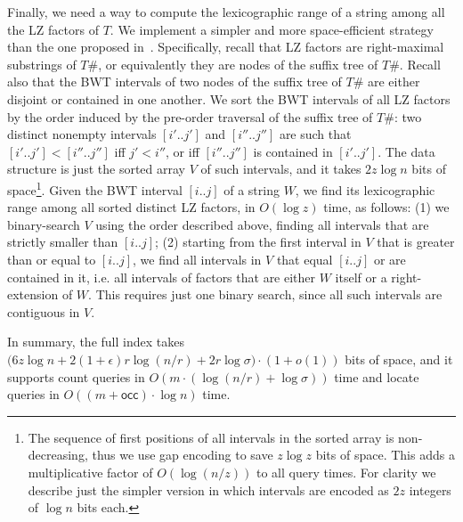 \documentclass[a4paper,UKenglish]{lipics-v2016}
\newcommand{\occ}
  {\ensuremath{\mathsf{occ}}}
\newcommand{\runs}{r}
\begin{document}
Finally, we need a way to compute the lexicographic range of a string among all the LZ factors of $T$. We implement a simpler and more space-efficient strategy than the one proposed in~\cite{belazzougui2015composite}. Specifically, recall that LZ factors are right-maximal substrings of $T\#$, or equivalently they are nodes of the suffix tree of $T\#$. Recall also that the BWT intervals of two nodes of the suffix tree of $T\#$ are either disjoint or contained in one another. We sort the BWT intervals of all LZ factors by the order induced by the pre-order traversal of the suffix tree of $T\#$: two distinct nonempty intervals $[i'..j']$ and $[i''..j'']$ are such that $[i'..j']<[i''..j'']$ iff $j'<i''$, or iff $[i''..j'']$ is contained in $[i'..j']$. The data structure is just the sorted array $V$ of such intervals, and it takes $2z\log{n}$ bits of space\footnote{The sequence of first positions of all intervals in the sorted array is non-decreasing, thus we use gap encoding to save $z\log{z}$ bits of space. This adds a multiplicative factor of $O(\log(n/z))$ to all query times. For clarity we describe just the simpler version in which intervals are encoded as $2z$ integers of $\log{n}$ bits each.}. Given the BWT interval $[i..j]$ of a string $W$, we find its lexicographic range among all sorted distinct LZ factors, in $O(\log{z})$ time, as follows: (1) we binary-search $V$ using the order described above, finding all intervals that are strictly smaller than $[i..j]$; (2) starting from the first interval in $V$ that is greater than or equal to $[i..j]$, we find all intervals in $V$ that equal $[i..j]$ or are contained in it, i.e. all intervals of factors that are either $W$ itself or a right-extension of $W$. This requires just one binary search, since all such intervals are contiguous in $V$.


In summary, the full index takes $\big( 6z\log{n} + 2(1+\epsilon)\runs\log(n/\runs) + 2\runs\log{\sigma} \big)\cdot(1+o(1))$ bits of space, and it supports count queries in $O(m\cdot (\log(n/\runs)+\log{\sigma}))$ time and locate queries in $O( (m + \occ)\cdot \log{n} )$ time.
\end{document}
